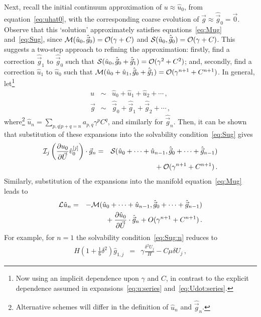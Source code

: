 \documentclass[12pt,a5paper]{article}
\begin{document}
Next, recall the initial continuum approximation of $u\approx\hat{u}_0$, from equation~\eqref{eq:uhat0},
with the corresponding coarse evolution of $\hat{\vec{g}}\approx\hat{\vec{g}}_0=\vec{0}$. Observe that this
`solution' approximately satisfies equations~\eqref{eq:Mug} and~\eqref{eq:Sug}, since
${\cal M}(\hat{u}_0,\hat{\vec{g}}_0)={\cal O}(\gamma+C)$ and
${\cal S}(\hat{u}_0,\hat{\vec{g}}_0)={\cal O}(\gamma+C)$.
This suggests a two-step approach to refining the approximation: firstly, find a correction
$\hat{\vec{g}}_1$ to $\hat{\vec{g}}_0$ such that ${\cal S}(\hat{u}_0,\hat{\vec{g}}_0+\hat{\vec{g}}_1)={\cal O}(\gamma^{2}+C^{2})$;
and, secondly, find a correction
$\hat{u}_1$ to $\hat{u}_0$ such that ${\cal M}(\hat{u}_0+\hat{u}_1,\hat{\vec{g}}_0+\hat{\vec{g}}_1)={\cal O}(\gamma^{n+1}+C^{n+1})$.
In general, let\footnote{Now using an implicit dependence 
upon $\gamma$ and $C$, in contrast to the explicit dependence assumed in expansions~\eqref{eq:u:series} and~\eqref{eq:Udot:series}.} 
\begin{eqnarray}
u & \sim & \hat{u}_0+\hat{u}_1+\hat{u}_2+\cdots\,,
\label{eq:new:u:series}
\\
\vec{g} & \sim & \hat{\vec{g}}_0+\hat{\vec{g}}_1+\hat{\vec{g}}_2+\cdots\,,
\label{eq:new:g:series}
\end{eqnarray}
where\footnote{Alternative schemes will differ in the definition of $\hat{u}_n$  and $\hat{\vec{g}}_n$.} 
$\hat{u}_n=\sum_{p,q|p+q=n}a_{p,q}\gamma^p C^q$, and similarly for $\hat{\vec{g}}_n$. 
Then, it can be shown that substitution of these expansions into the solvability condition~\eqref{eq:Sug} gives
\begin{eqnarray}
{\cal I}_j\left(\D {\vec U}{u_0}\hat{v}_0^{[j]}\right)\cdot\vec{g}_n & = &
{\cal S}(\hat{u}_0+\cdots+\hat{u}_{n-1},
\hat{\vec{g}}_0+\cdots+\hat{\vec{g}}_{n-1})
\nonumber\\
&&{}+{\cal O}(\gamma^{n+1}+C^{n+1})\,.
\label{eq:Sug:n}
\end{eqnarray}
Similarly, substitution of the expansions into the manifold equation~\eqref{eq:Mug} leads to
\begin{eqnarray}
{\cal L}\hat{u}_n & = & -{\cal M}(\hat{u}_0+\cdots+\hat{u}_{n-1},
\hat{\vec{g}}_0+\cdots+\hat{\vec{g}}_{n-1})
\nonumber\\
&&{}+\D{\vec{U}}{\hat{u}_0}\cdot\hat{\vec{g}}_n+O(\gamma^{n+1}+C^{n+1})\,.
\end{eqnarray}
For example, for $n=1$ the solvability condition~\eqref{eq:Sug:n} reduces to
\begin{eqnarray}
	H\left(1+\frac{1}{6}\delta^2\right)\hat{g}_{1,j} & = & 
\gamma\frac{\delta^2U_j}{H} - C\mu\delta U_j\,,
\end{eqnarray}
\end{document}
